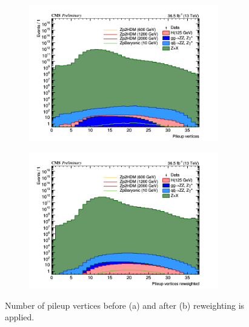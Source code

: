 \begin{figure}[tbh]
\begin{subfigure}{0.5\textwidth}
\centering
\includegraphics[width=3.25in]{figures/hist_hPUvertices.png}
\caption{}
\end{subfigure}
\begin{subfigure}{0.5\textwidth}
\centering
\includegraphics[width=3.25in]{figures/hist_hPUvertices_ReWeighted.png}
\caption{}
\end{subfigure}
\caption{Number of pileup vertices before (a) and after (b) reweighting is applied.}
\label{fig:pu}
\end{figure}







